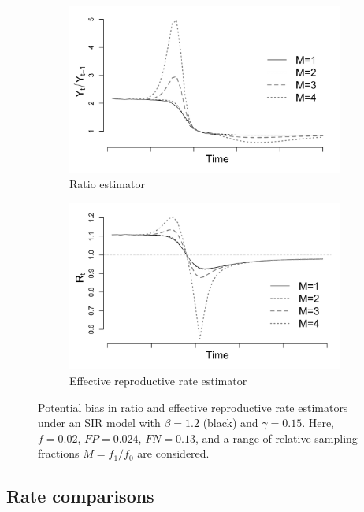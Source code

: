 \documentclass[11pt]{amsart}
\numberwithin{equation}{section}
\theoremstyle{plain}
\begin{document}
 \begin{figure}
 \centering
 \begin{subfigure}{.5\textwidth}
  \centering
  \includegraphics[width=.9\linewidth]{../figs/sir_ratio.png}
  \caption{Ratio estimator}
  \label{fig:ratio-bias}
 \end{subfigure}%
 \begin{subfigure}{.5\textwidth}
  \centering
  \includegraphics[width=.9\linewidth]{../figs/sir_rt.png}
  \caption{Effective reproductive rate estimator}
  \label{fig:r0-bias}
 \end{subfigure}
 \caption{Potential bias in ratio and effective reproductive rate estimators under an SIR model with $\beta = 1.2$ (black) and $\gamma = 0.15$.  Here, $f = 0.02$, $FP = 0.024$, $FN = 0.13$, and a range of relative sampling fractions $M = f_1/f_0$ are considered.}
 \label{fig:rates}
 \end{figure}

 \subsection{Rate comparisons}
\end{document}
